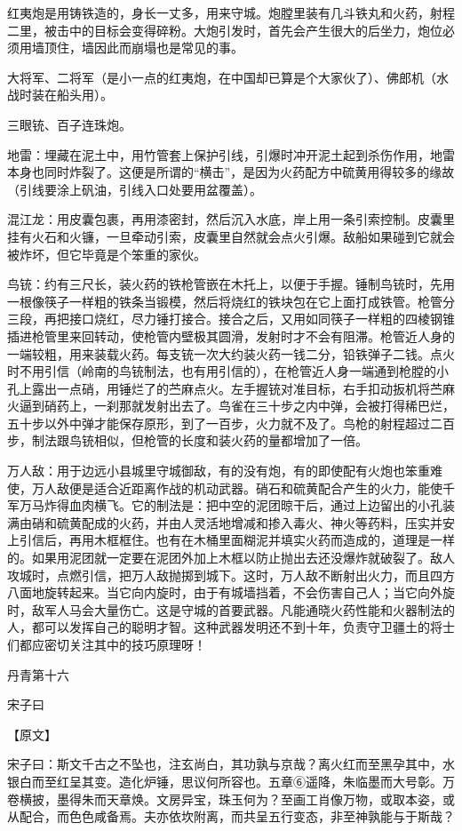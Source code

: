 \documentclass[12pt,UTF8]{ctexbook}
\begin{document}
红夷炮是用铸铁造的，身长一丈多，用来守城。炮膛里装有几斗铁丸和火药，射程二里，被击中的目标会变得碎粉。大炮引发时，首先会产生很大的后坐力，炮位必须用墙顶住，墙因此而崩塌也是常见的事。

大将军、二将军（是小一点的红夷炮，在中国却已算是个大家伙了）、佛郎机（水战时装在船头用）。

三眼铳、百子连珠炮。

地雷：埋藏在泥土中，用竹管套上保护引线，引爆时冲开泥土起到杀伤作用，地雷本身也同时炸裂了。这便是所谓的“横击”，是因为火药配方中硫黄用得较多的缘故（引线要涂上矾油，引线入口处要用盆覆盖）。

混江龙：用皮囊包裹，再用漆密封，然后沉入水底，岸上用一条引索控制。皮囊里挂有火石和火镰，一旦牵动引索，皮囊里自然就会点火引爆。敌船如果碰到它就会被炸坏，但它毕竟是个笨重的家伙。

鸟铳：约有三尺长，装火药的铁枪管嵌在木托上，以便于手握。锤制鸟铳时，先用一根像筷子一样粗的铁条当锻模，然后将烧红的铁块包在它上面打成铁管。枪管分三段，再把接口烧红，尽力锤打接合。接合之后，又用如同筷子一样粗的四棱钢锥插进枪管里来回转动，使枪管内壁极其圆滑，发射时才不会有阻滞。枪管近人身的一端较粗，用来装载火药。每支铳一次大约装火药一钱二分，铅铁弹子二钱。点火时不用引信（岭南的鸟铳制法，也有用引信的），在枪管近人身一端通到枪膛的小孔上露出一点硝，用锤烂了的苎麻点火。左手握铳对准目标，右手扣动扳机将苎麻火逼到硝药上，一刹那就发射出去了。鸟雀在三十步之内中弹，会被打得稀巴烂，五十步以外中弹才能保存原形，到了一百步，火力就不及了。鸟枪的射程超过二百步，制法跟鸟铳相似，但枪管的长度和装火药的量都增加了一倍。

万人敌：用于边远小县城里守城御敌，有的没有炮，有的即使配有火炮也笨重难使，万人敌便是适合近距离作战的机动武器。硝石和硫黄配合产生的火力，能使千军万马炸得血肉横飞。它的制法是：把中空的泥团晾干后，通过上边留出的小孔装满由硝和硫黄配成的火药，并由人灵活地增减和掺入毒火、神火等药料，压实并安上引信后，再用木框框住。也有在木桶里面糊泥并填实火药而造成的，道理是一样的。如果用泥团就一定要在泥团外加上木框以防止抛出去还没爆炸就破裂了。敌人攻城时，点燃引信，把万人敌抛掷到城下。这时，万人敌不断射出火力，而且四方八面地旋转起来。当它向内旋时，由于有城墙挡着，不会伤害自己人；当它向外旋时，敌军人马会大量伤亡。这是守城的首要武器。凡能通晓火药性能和火器制法的人，都可以发挥自己的聪明才智。这种武器发明还不到十年，负责守卫疆土的将士们都应密切关注其中的技巧原理呀！

丹青第十六

宋子曰

【原文】

宋子曰：斯文千古之不坠也，注玄尚白，其功孰与京哉？离火红而至黑孕其中，水银白而至红呈其变。造化炉锤，思议何所容也。五章⑥遥降，朱临墨而大号彰。万卷横披，墨得朱而天章焕。文房异宝，珠玉何为？至画工肖像万物，或取本姿，或从配合，而色色咸备焉。夫亦依坎附离，而共呈五行变态，非至神孰能与于斯哉？
\end{document}
